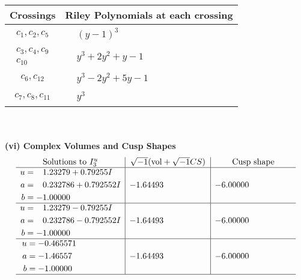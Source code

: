 \documentclass[1p]{elsarticle_modified}
\theoremstyle{definition}
\newcommand{\I}{\sqrt{-1}}
\begin{document}
\begin{tabular}{m{50pt}|m{274pt}}
Crossings & \hspace{64pt}Riley Polynomials at each crossing \\
\hline $$\begin{aligned}c_{1},c_{2},c_{5}\end{aligned}$$&$\begin{aligned}
&(y-1)^3
\end{aligned}$\\
\hline $$\begin{aligned}c_{3},c_{4},c_{9}\\c_{10}\end{aligned}$$&$\begin{aligned}
&y^3+2 y^2+y-1
\end{aligned}$\\
\hline $$\begin{aligned}c_{6},c_{12}\end{aligned}$$&$\begin{aligned}
&y^3-2 y^2+5 y-1
\end{aligned}$\\
\hline $$\begin{aligned}c_{7},c_{8},c_{11}\end{aligned}$$&$\begin{aligned}
&y^3
\end{aligned}$\\
\hline
\end{tabular}\\~\\
\newpage\flushleft \textbf{(vi) Complex Volumes and Cusp Shapes}
$$\begin{array}{c|c|c}  
\text{Solutions to }I^u_{3}& \I (\text{vol} + \sqrt{-1}CS) & \text{Cusp shape}\\
 \hline 
\begin{aligned}
u &= \phantom{-}1.23279 + 0.79255 I \\
a &= \phantom{-}0.232786 + 0.792552 I \\
b &= -1.00000\phantom{ +0.000000I}\end{aligned}
 & -1.64493\phantom{ +0.000000I} & -6.00000\phantom{ +0.000000I} \\ \hline\begin{aligned}
u &= \phantom{-}1.23279 - 0.79255 I \\
a &= \phantom{-}0.232786 - 0.792552 I \\
b &= -1.00000\phantom{ +0.000000I}\end{aligned}
 & -1.64493\phantom{ +0.000000I} & -6.00000\phantom{ +0.000000I} \\ \hline\begin{aligned}
u &= -0.465571\phantom{ +0.000000I} \\
a &= -1.46557\phantom{ +0.000000I} \\
b &= -1.00000\phantom{ +0.000000I}\end{aligned}
 & -1.64493\phantom{ +0.000000I} & -6.00000\phantom{ +0.000000I}\\
 \hline 
 \end{array}$$\newpage
\end{document}
